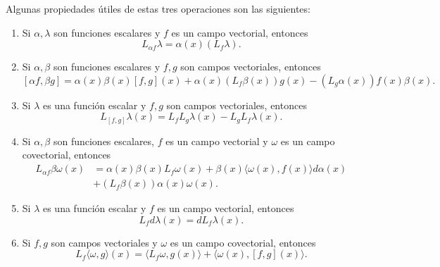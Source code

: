 Algunas propiedades útiles de estas tres operaciones son las siguientes:
\begin{enumerate}
	\item Si $\alpha, \lambda$ son funciones escalares y $f$ es un campo vectorial, entonces
	      \begin{equation*}
		      L_{\alpha f}\lambda = \alpha(x) (L_f \lambda).
	      \end{equation*}
	\item Si $\alpha, \beta$ son funciones escalares y $f,g$ son campos vectoriales, entonces
	      \begin{equation*}
		      \left[ \alpha f, \beta g \right] = \alpha(x) \beta(x) [f,g](x) + \alpha(x)(L_f \beta(x))g(x) - (L_g \alpha(x))f(x) \beta(x).
	      \end{equation*}
	\item Si $\lambda$ es una función escalar y $f,g$ son campos vectoriales, entonces
	      \begin{equation*}
		      L_{[f,g]}\lambda(x) = L_fL_g\lambda(x) - L_gL_f\lambda(x).
	      \end{equation*}
	\item Si $\alpha, \beta$ son funciones escalares, $f$ es un campo vectorial y $\omega$ es un campo covectorial, entonces
	      \begin{equation*}
		      \begin{aligned}
			      L_{\alpha f}\beta\omega(x) & = \alpha(x)\beta(x)L_f \omega(x) + \beta(x)\langle \omega(x), f(x) \rangle d\alpha(x) \\
			                                 & + (L_f \beta(x))\alpha(x)\omega(x).
		      \end{aligned}
	      \end{equation*}
	\item Si $\lambda$ es una función escalar y $f$ es un campo vectorial, entonces
	      \begin{equation*}
		      L_f d\lambda(x) = dL_f \lambda(x).
	      \end{equation*}
    \item Si $f,g$ son campos vectoriales y $\omega$ es un campo covectorial, entonces
    \begin{equation*}
        L_f \langle \omega, g \rangle (x) = \langle L_f \omega, g(x) \rangle + \langle \omega(x), [f,g](x) \rangle.
    \end{equation*}
\end{enumerate}


